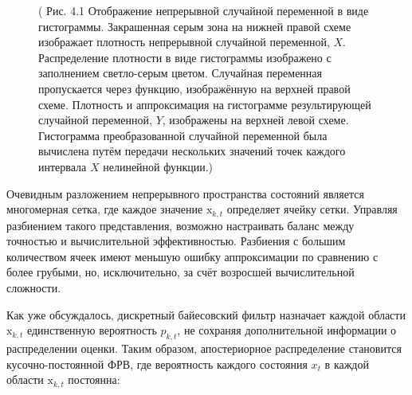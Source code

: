 \documentclass[10pt,a4paper]{article}
\begin{document}
\begin{figure}[H]
	\caption{ (  Рис. 4.1 Отображение непрерывной случайной переменной в виде гистограммы. Закрашенная серым зона на нижней правой схеме изображает плотность непрерывной случайной переменной, $X$. Распределение плотности в виде гистограммы изображено с заполнением светло-серым цветом. Случайная переменная пропускается через функцию, изображённую на верхней правой схеме. Плотность и аппроксимация на гистограмме результирующей случайной переменной, $Y$, изображены на верхней левой схеме. Гистограмма преобразованной случайной переменной была вычислена путём передачи нескольких значений точек каждого интервала $X$ нелинейной функции.)}
	\label{fig:41orig}
\end{figure}

Очевидным разложением непрерывного пространства состояний является многомерная сетка, где каждое значение $\text{x}_{k,t}$ определяет ячейку сетки. Управляя разбиением такого представления, возможно настраивать баланс между точностью и вычислительной эффективностью. Разбиения с большим количеством ячеек имеют меньшую ошибку аппроксимации по сравнению с более грубыми, но, исключительно, за счёт возросшей вычислительной сложности.

Как уже обсуждалось, дискретный байесовский фильтр назначает каждой области 
$\text{x}_{k,t}$ единственную вероятность $p_{k,t}$, не сохраняя дополнительной информации о распределении оценки. Таким образом, апостериорное распределение становится кусочно-постоянной ФРВ, где вероятность каждого состояния $x_t$ в каждой области $\text{x}_{k,t}$ постоянна:\\
\end{document}
